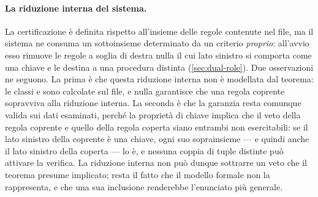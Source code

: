 \paragraph{La riduzione interna del sistema.} La certificazione è definita rispetto all'insieme
delle regole contenute nel file, ma il sistema ne consuma un sottoinsieme determinato da un
criterio \emph{proprio}: all'avvio esso rimuove le regole a soglia di destra nulla il cui lato
sinistro si comporta come una chiave e le destina a una procedura distinta
(\autoref{sec:dual-role}). Due osservazioni ne seguono. La prima è che questa riduzione interna
non è modellata dal teorema: le classi \Vtwo{} e \Vthree{} sono calcolate sul file, e nulla
garantisce che una regola coprente sopravviva alla riduzione interna. La seconda è che la
garanzia resta comunque valida sui dati esaminati, perché la proprietà di chiave implica che il
veto della regola coprente e quello della regola coperta siano entrambi non esercitabili: se il
lato sinistro della coprente è una chiave, ogni suo soprainsieme --- e quindi anche il lato
sinistro della coperta --- lo è, e nessuna coppia di tuple distinte può attivare la verifica. La
riduzione interna non può dunque sottrarre un veto che il teorema presume implicato; resta il
fatto che il modello formale non la rappresenta, e che una sua inclusione renderebbe
l'enunciato più generale.
